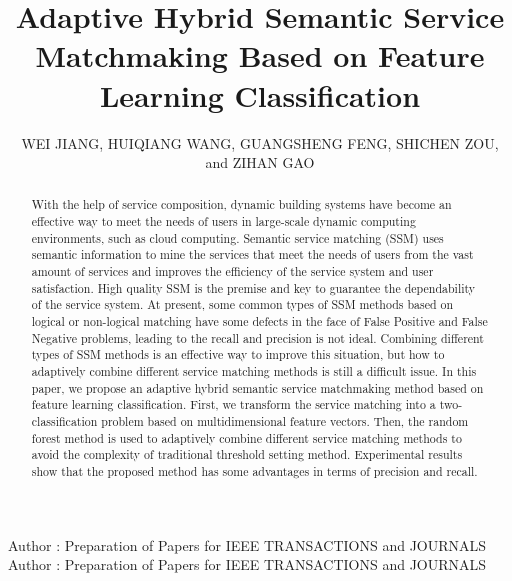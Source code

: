 \documentclass{ieeeaccess}
\begin{document}

\title{Adaptive Hybrid Semantic Service Matchmaking Based on Feature Learning Classification}
\author{
\uppercase{Wei Jiang},
\uppercase{Huiqiang Wang},
\uppercase{Guangsheng Feng},
\uppercase{Shichen Zou},
and \uppercase{Zihan Gao}
}

\address[1]{College of Computer Science and Technology, Harbin Engineering University, Harbin, 150080, China}
\address[2]{College of Computer Science and Information Engineering, Harbin Normal University, Harbin, 150080, China}
\address[3]{Huawei Nanjing Research Institute, Huawei Technologies Co., Ltd., Nanjing, 210046, China}

\markboth
{Author \headeretal: Preparation of Papers for IEEE TRANSACTIONS and JOURNALS}
{Author \headeretal: Preparation of Papers for IEEE TRANSACTIONS and JOURNALS}


\begin{abstract}
With the help of service composition, dynamic building systems have become an effective way to meet the needs of users in large-scale dynamic computing environments, such as cloud computing. Semantic service matching (SSM) uses semantic information to mine the services that meet the needs of users from the vast amount of services and improves the efficiency of the service system and user satisfaction. High quality SSM is the premise and key to guarantee the dependability of the service system. At present, some common types of SSM methods based on logical or non-logical matching have some defects in the face of False Positive and False Negative problems, leading to the recall and precision is not ideal. Combining different types of SSM methods is an effective way to improve this situation, but how to adaptively combine different service matching methods is still a difficult issue. In this paper, we propose an adaptive hybrid semantic service matchmaking method based on feature learning classification. First, we transform the service matching into a two-classification problem based on multidimensional feature vectors. Then, the random forest method is used to adaptively combine different service matching methods to avoid the complexity of traditional threshold setting method. Experimental results show that the proposed method has some advantages in terms of precision and recall.
\end{abstract}
\end{document}
